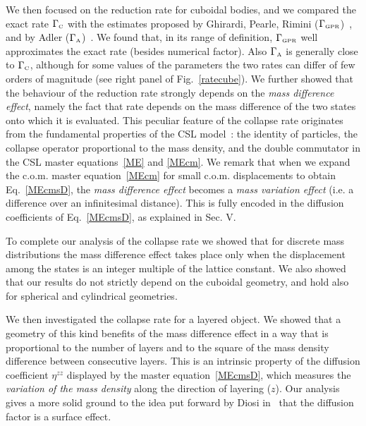 \documentclass[11pt,onecolumn,amssymb,nofootinbib]{revtex4}
\begin{document}
We then focused on the reduction rate for cuboidal bodies, and we compared the exact rate $\Gamma_\text{\tiny{C}}$ with the estimates proposed by Ghirardi, Pearle, Rimini ($\Gamma_\text{\tiny{GPR}}$)~\cite{CSL}, and by Adler ($\Gamma_\text{\tiny{A}}$)~\cite{Adl07}. We found that, in its range of definition, $\Gamma_\text{\tiny{GPR}}$  well approximates the exact rate (besides numerical factor). Also $\Gamma_\text{\tiny{A}}$ is generally close to $\Gamma_\text{\tiny{C}}$, although for some values of the parameters the two rates can differ of few orders of magnitude (see right panel of Fig.~\ref{ratecube}). We further showed that the behaviour of the reduction rate strongly depends on the \emph{mass difference effect}, namely the fact that rate depends on the mass difference of the two states onto which it is evaluated. This peculiar feature of the collapse rate originates from the fundamental properties of the CSL model~\cite{CSL}: the identity of particles, the collapse operator proportional to the mass density, and the double commutator in the CSL master equations~\eqref{ME} and \eqref{MEcm}. We remark that when we expand the c.o.m. master equation~\eqref{MEcm} for small c.o.m. displacements to obtain Eq.~\eqref{MEcmsD}, the  \emph{mass difference effect} becomes a  \emph{mass variation effect} (i.e. a difference over an infinitesimal distance). This is fully encoded in the diffusion coefficients of Eq.~\eqref{MEcmsD}, as explained in Sec. V. 

To complete our analysis of the collapse rate we showed that for discrete mass distributions the mass difference effect takes place only when the displacement among the states is an integer multiple of the lattice constant. We also showed that our results do not strictly depend on the cuboidal geometry, and hold also for spherical and cylindrical geometries.

We then investigated the collapse rate for a layered object.
We showed that a geometry of this kind benefits of the mass difference effect in a way that is proportional to the number of layers and to the square of the mass density difference between consecutive layers. This is an intrinsic property of the diffusion coefficient $\eta^{zz}$ displayed by the master equation~\eqref{MEcmsD}, which measures the \emph{variation of the mass density} along the direction of layering ($z$). Our analysis gives a more solid ground to the idea put forward by Diosi in~\cite{Dio19} that the diffusion factor is a surface effect.

\end{document}
